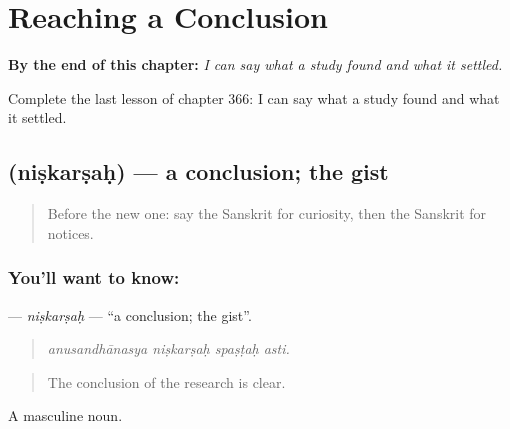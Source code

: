 
\chapter{Reaching a Conclusion}
\label{ch:sa-reaching-a-conclusion}

\begin{chapteropening}
\textbf{By the end of this chapter:} \emph{I can say what a study found and what it settled.}

Complete the last lesson of chapter 366: I can say what a study found and what it settled.
\end{chapteropening}

\section[\texorpdfstring{\sk{निष्कर्षः} (niṣkarṣaḥ)}{निष्कर्षः (niṣkarṣaḥ)}]{ (niṣkarṣaḥ) — a conclusion; the gist}

\label{lesson:SA-C366-niskarsah}



\begin{quote}
Before the new one: say the Sanskrit for curiosity, then the Sanskrit for notices.
\end{quote}

\subsection*{You'll want to know: }
\textbf{} — \emph{niṣkarṣaḥ} — \textquotedblleft{}a conclusion; the gist\textquotedblright{}.

\begin{quote}
   
\end{quote}

\begin{quote}
\emph{anusandhānasya niṣkarṣaḥ spaṣṭaḥ asti.}
\end{quote}

\begin{quote}
The conclusion of the research is clear.
\end{quote}

A masculine noun.

